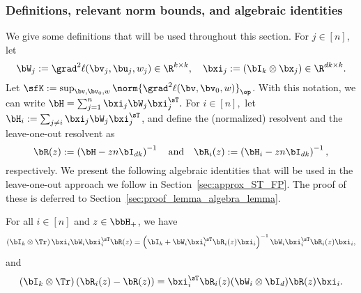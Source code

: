 \subsubsection{Definitions, relevant norm bounds, and algebraic identities}
We give some definitions that will be used throughout this section. For $j\in [n]$, let
\begin{equation*}
    \bW_j := \grad^2 \ell(\bv_j, \bu_j, w_j) \in \R^{k\times k},
\quad\bxi_j := (\bI_k \otimes \bx_j)\in\R^{dk\times k}.
\end{equation*}
Let $\sfK := \sup_{\bv,\bv_0,w} \norm{\grad^2 \ell(\bv,\bv_0,w)}_{\op}$.
With this notation,  we can write 
   $\bH =  \sum_{j=1}^n \bxi_j \bW_j \bxi_j^{\sT}.$
For $i\in[n],$ let $\bH_i := \sum_{j\neq i} \bxi_j \bW_j \bxi_j^\sT$,
and define the (normalized) resolvent and the leave-one-out resolvent as
\begin{equation*}
\bR(z) := \left(\bH - z n \bI_{dk}\right)^{-1}\quad
\textrm{and}\quad
\bR_i(z) := \left(\bH_i  - z n \bI_{dk}\right)^{-1},
\end{equation*}
respectively.
We present the following algebraic identities that will be used in the leave-one-out approach we follow in Section~\ref{sec:approx_ST_FP}. The proof of these is deferred to Section~\ref{sec:proof_lemma_algebra_lemma}.
\begin{lemma}
\label{lemma:algebra_lemma}
    For all $i\in[n]$ and $z\in\bbH_+$, we have
    \begin{equation}
\label{eq:alg_id1}
        \left(\bI_k \otimes \Tr\right)\bxi_i \bW_i \bxi_i^\sT \bR(z)  =  \left( \bI_k + \bW_i \bxi_i^\sT \bR_i(z) \bxi_i\right)^{-1}
        \bW_i\bxi_i^\sT \bR_i(z)\bxi_i,
    \end{equation}
and
\begin{equation}
\label{eq:alg_id2}
    \left(\bI_k \otimes \Tr\right) \left(\bR_i(z)-  \bR(z)\right)  =  \bxi_i^\sT \bR_i(z) (\bW_i \otimes \bI_d) \bR(z)\bxi_i.
\end{equation}

\end{lemma}

